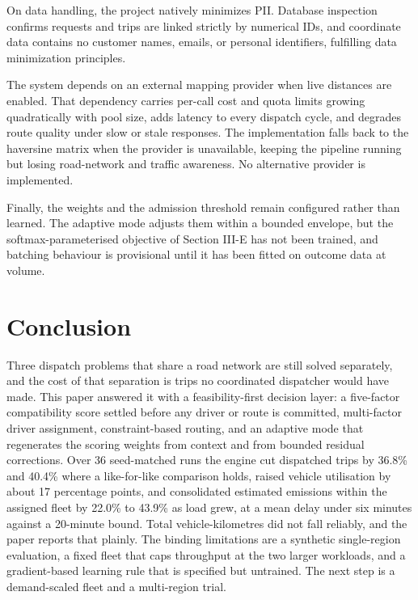 \documentclass[conference]{IEEEtran}
\begin{document}
On data handling, the project natively minimizes PII. Database inspection confirms requests and trips are linked strictly by numerical IDs, and coordinate data contains no customer names, emails, or personal identifiers, fulfilling data minimization principles.

The system depends on an external mapping provider when live distances are enabled. That dependency carries per-call cost and quota limits growing quadratically with pool size, adds latency to every dispatch cycle, and degrades route quality under slow or stale responses. The implementation falls back to the haversine matrix when the provider is unavailable, keeping the pipeline running but losing road-network and traffic awareness. No alternative provider is implemented.

Finally, the weights and the admission threshold remain configured rather than learned. The adaptive mode adjusts them within a bounded envelope, but the softmax-parameterised objective of Section III-E has not been trained, and batching behaviour is provisional until it has been fitted on outcome data at volume.

\section{Conclusion}
Three dispatch problems that share a road network are still solved separately, and the cost of that separation is trips no coordinated dispatcher would have made. This paper answered it with a feasibility-first decision layer: a five-factor compatibility score settled before any driver or route is committed, multi-factor driver assignment, constraint-based routing, and an adaptive mode that regenerates the scoring weights from context and from bounded residual corrections. Over 36 seed-matched runs the engine cut dispatched trips by 36.8\% and 40.4\% where a like-for-like comparison holds, raised vehicle utilisation by about 17 percentage points, and consolidated estimated emissions within the assigned fleet by 22.0\% to 43.9\% as load grew, at a mean delay under six minutes against a 20-minute bound. Total vehicle-kilometres did not fall reliably, and the paper reports that plainly. The binding limitations are a synthetic single-region evaluation, a fixed fleet that caps throughput at the two larger workloads, and a gradient-based learning rule that is specified but untrained. The next step is a demand-scaled fleet and a multi-region trial.
\end{document}
